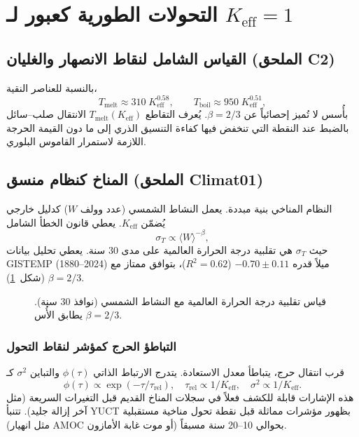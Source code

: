 \documentclass[12pt,a4paper]{article}
\newcommand{\Keff}{K_{\mathrm{eff}}}
\begin{document}
	\section{التحولات الطورية كعبور لـ \(\Keff = 1\)}
	\subsection{القياس الشامل لنقاط الانصهار والغليان (الملحق C2)}
	بالنسبة للعناصر النقية،
	\[
	T_{\text{melt}} \approx 310\;\Keff^{0.58}, \qquad
	T_{\text{boil}} \approx 950\;\Keff^{0.51},
	\]
	بأُسس لا تُميز إحصائياً عن \(\beta = 2/3\). يُعرف التقاطع \(T_{\text{melt}}(\Keff)\) الانتقال صلب–سائل بالضبط عند النقطة التي تنخفض فيها كفاءة التنسيق الذري إلى ما دون القيمة الحرجة اللازمة لاستمرار القاموس البلوري.
	
	\subsection{المناخ كنظام منسق (الملحق Climat01)}
	النظام المناخي بنية مبددة. يعمل النشاط الشمسي (عدد وولف \(W\)) كدليل خارجي يُضمّن \(\Keff\). يعطي قانون الخطأ الشامل
	\[
	\sigma_T \propto \langle W \rangle^{-\beta},
	\]
	حيث \(\sigma_T\) هي تقلبية درجة الحرارة العالمية على مدى 30 سنة. يعطي تحليل بيانات GISTEMP (1880–2024) ميلاً قدره \(-0.70\pm0.11\) (\(R^2=0.62\))، بتوافق ممتاز مع \(\beta = 2/3\) (شكل~\ref{fig:climate_scaling}).
	
	\begin{otherlanguage}{english}
		\begin{figure}[H]
			\centering
			\caption{قياس تقلبية درجة الحرارة العالمية مع النشاط الشمسي (نوافذ 30 سنة). يطابق الأُس \(\beta = 2/3\).}
			\label{fig:climate_scaling}
		\end{figure}
	\end{otherlanguage}
	
	\subsubsection{التباطؤ الحرج كمؤشر لنقاط التحول}
	قرب انتقال حرج، يتباطأ معدل الاستعادة. يتدرج الارتباط الذاتي \(\phi(\tau)\) والتباين \(\sigma^2\) كـ
	\[
	\phi(\tau) \propto \exp(-\tau/\tau_{\text{rel}}),\quad
	\tau_{\text{rel}} \propto 1/\Keff,\quad
	\sigma^2 \propto 1/\Keff.
	\]
	هذه الإشارات قابلة للكشف فعلاً في سجلات المناخ القديم قبل التغيرات السريعة (مثل آخر إزالة جليد). تتنبأ YUCT بظهور مؤشرات مماثلة قبل نقطة تحول مناخية مستقبلية (مثل انهيار AMOC أو موت غابة الأمازون) بحوالي 10–20 سنة مسبقاً.
	
\end{document}
